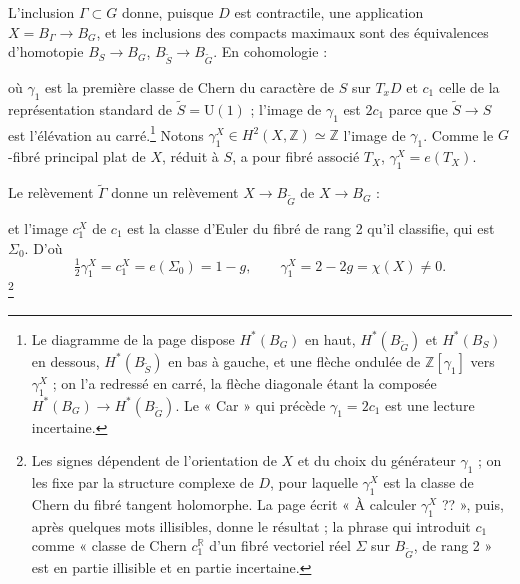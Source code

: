 \documentclass[11pt,a4paper]{article}
\begin{document}
L'inclusion $\Gamma \subset G$ donne, puisque $D$ est contractile, une
application $X = B_{\Gamma} \to B_{G}$, et les inclusions des compacts
maximaux sont des équivalences d'homotopie $B_{S} \to B_{G}$, $B_{\widetilde{S}}
\to B_{\widetilde{G}}$. En cohomologie :
où $\gamma_{1}$ est la première classe de Chern du caractère de $S$ sur
$T_{x}D$ et $c_{1}$ celle de la représentation standard de $\widetilde{S} =
\mathrm{U}(1)$ ; l'image de $\gamma_{1}$ est $2c_{1}$ parce que $\widetilde{S}
\to S$ est l'élévation au carré.\footnote{Le diagramme de la page dispose
$H^{*}(B_{G})$ en haut, $H^{*}(B_{\widetilde{G}})$ et $H^{*}(B_{S})$ en
dessous, $H^{*}(B_{\widetilde{S}})$ en bas à gauche, et une flèche ondulée de
$\mathbb{Z}[\gamma_{1}]$ vers $\gamma_{1}^{X}$ ; on l'a redressé en carré, la
flèche diagonale étant la composée $H^{*}(B_{G}) \to H^{*}(B_{\widetilde{G}})$.
Le « Car » qui précède $\gamma_{1} = 2c_{1}$ est une lecture incertaine.}
Notons $\gamma_{1}^{X} \in H^{2}(X,\mathbb{Z}) \simeq \mathbb{Z}$ l'image de
$\gamma_{1}$. Comme le $G$-fibré principal plat de $X$, réduit à $S$, a pour
fibré associé $T_{X}$, $\gamma_{1}^{X} = e(T_{X})$.

Le relèvement $\widetilde{\Gamma}$ donne un relèvement $X \to
B_{\widetilde{G}}$ de $X \to B_{G}$ :
et l'image $c_{1}^{X}$ de $c_{1}$ est la classe d'Euler du fibré de rang 2
qu'il classifie, qui est $\Sigma_{0}$. D'où
\[
  \tfrac{1}{2}\gamma_{1}^{X} = c_{1}^{X} = e(\Sigma_{0}) = 1 - g, \qquad
  \boxed{\gamma_{1}^{X} = 2 - 2g = \chi(X) \neq 0.}
\]
\footnote{Les signes dépendent de l'orientation de $X$ et du choix du
générateur $\gamma_{1}$ ; on les fixe par la structure complexe de $D$,
pour laquelle $\gamma_{1}^{X}$ est la classe de Chern du fibré tangent
holomorphe. La page écrit « À calculer $\gamma_{1}^{X}$ ?? », puis, après
quelques mots illisibles, donne le résultat ; la phrase qui introduit $c_{1}$
comme « classe de Chern $c_{1}^{\mathbb{R}}$ d'un fibré vectoriel réel
$\Sigma$ sur $B_{\widetilde{G}}$, de rang 2 » est en partie illisible et en
partie incertaine.}
\end{document}
